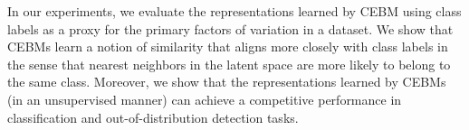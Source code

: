 \documentclass{article}
\begin{document}



In our experiments, we evaluate the representations learned by CEBM using class labels
as a proxy for the primary factors of variation in a dataset. We show that CEBMs learn a notion of similarity that aligns more closely with class labels in the sense that nearest neighbors in the latent space are more likely to belong to the same class. Moreover, we show that the representations learned by CEBMs (in an unsupervised manner) can achieve a competitive performance in classification and out-of-distribution detection tasks.
\end{document}
